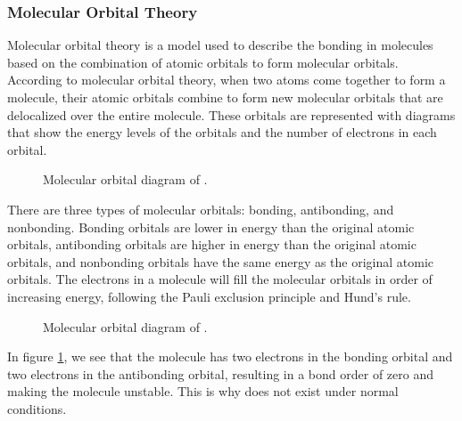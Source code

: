 \subsubsection{Molecular Orbital Theory}
Molecular orbital theory is a model used to describe the bonding in molecules based on the combination of atomic orbitals to form molecular orbitals. According to molecular orbital theory, when two atoms come together to form a molecule, their atomic orbitals combine to form new molecular orbitals that are delocalized over the entire molecule. These orbitals are represented with diagrams that show the energy levels of the orbitals and the number of electrons in each orbital. 
\begin{figure}[h]
    \centering
    \begin{modiagram}[style=square,labels,names,AO-width=8pt,labels-fs=\footnotesize]
\EnergyAxis
\end{modiagram}
\caption{Molecular orbital diagram of .}
\end{figure}
There are three types of molecular orbitals: bonding, antibonding, and nonbonding. Bonding orbitals are lower in energy than the original atomic orbitals, antibonding orbitals are higher in energy than the original atomic orbitals, and nonbonding orbitals have the same energy as the original atomic orbitals. The electrons in a molecule will fill the molecular orbitals in order of increasing energy, following the Pauli exclusion principle and Hund's rule. 
\begin{figure}[h]
    \centering
    \begin{modiagram}[style=square,labels,names,AO-width=8pt,labels-fs=\footnotesize]
        
\EnergyAxis
\end{modiagram}
\caption{Molecular orbital diagram of .}
\label{fig:he2MO}
\end{figure}
In figure \ref{fig:he2MO}, we see that the  molecule has two electrons in the bonding orbital and two electrons in the antibonding orbital, resulting in a bond order of zero and making the molecule unstable. This is why  does not exist under normal conditions.

